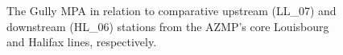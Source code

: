 \documentclass[12pt]{article}\usepackage[]{graphicx}\usepackage[]{color}
\begin{document}
\begin{figure}[htb]

{\centering {} 

}

\caption{The Gully MPA in relation to comparative upstream (LL\_07) and downstream (HL\_06) stations from the AZMP's core Louisbourg and Halifax lines, respectively.}\label{fig:figure3}
\end{figure}
\clearpage
\end{document}
